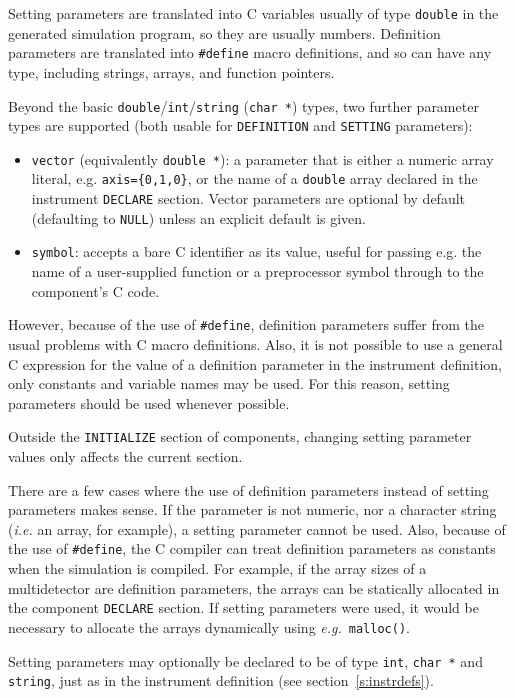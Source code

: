 Setting parameters are translated into C variables usually of type
\verb+double+ in the generated simulation program, so they are usually
numbers. Definition parameters are translated into \verb+#define+ macro
definitions, and so can have any type, including strings, arrays, and
function pointers.

Beyond the basic \verb+double+/\verb+int+/\verb+string+ (\verb+char *+)
types, two further parameter types are supported (both usable for
\texttt{DEFINITION} and \texttt{SETTING} parameters):
\begin{itemize}
\item \verb+vector+ (equivalently \verb+double *+): a parameter that is
  either a numeric array literal, e.g. \verb+axis={0,1,0}+, or the name of
  a \texttt{double} array declared in the instrument \texttt{DECLARE}
  section. Vector parameters are optional by default (defaulting to
  \texttt{NULL}) unless an explicit default is given.
\item \verb+symbol+: accepts a bare C identifier as its value, useful for
  passing e.g. the name of a user-supplied function or a preprocessor
  symbol through to the component's C code.
\end{itemize}

However, because of the use of \verb+#define+, definition parameters
suffer from the usual problems with C macro definitions. Also, it is not
possible to use a general C expression for the value of a definition
parameter in the instrument definition, only constants and variable
names may be used. For this reason, setting parameters should be used
whenever possible.

Outside the \verb+INITIALIZE+ section of components, changing setting parameter
values only affects the current section.

There are a few cases where the use of definition parameters instead of
setting parameters makes sense. If the parameter is not numeric, nor a character string ({\em i.e.} an
array, for example), a setting parameter cannot be
used. Also, because of the use of \verb+#define+, the C compiler can
treat definition parameters as constants when the simulation is
compiled. For example, if the array sizes of a multidetector are
definition parameters, the arrays can be statically allocated in the
component \verb+DECLARE+ section. If setting parameters were used, it
would be necessary to allocate the arrays dynamically using {\em e.g.}\
\verb+malloc()+.

Setting parameters may optionally be declared to be of type \verb+int+,
\verb+char *+ and \verb+string+, just as in the instrument definition (see
section~\ref{s:instrdefs}).

